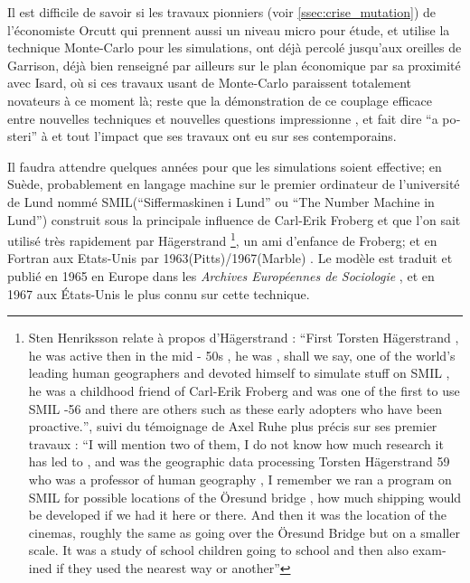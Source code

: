 Il est difficile de savoir si les travaux pionniers (voir \ref{ssec:crise_mutation}) de l'économiste Orcutt \autocite{Orcutt1957, Orcutt1960} qui prennent aussi un niveau micro pour étude, et utilise la technique Monte-Carlo pour les simulations, ont déjà percolé jusqu'aux oreilles de Garrison, déjà bien renseigné par ailleurs sur le plan économique par sa proximité avec Isard, où si ces travaux usant de Monte-Carlo paraissent totalement novateurs à ce moment là; reste que la démonstration de ce couplage efficace entre nouvelles techniques et nouvelles questions impressionne \autocite[120]{Unwin1992}, et fait dire \foreignquote{latin}{a posteri} à \textcite{Morril2005} et \textcite{Gould1970} tout l'impact que ses travaux ont eu sur ses contemporains.

Il faudra attendre quelques années pour que les simulations soient effective; en Suède, probablement en langage machine sur le premier ordinateur de l'université de Lund nommé SMIL(\foreignquote{sweden}{Siffermaskinen i Lund} ou \foreignquote{english}{The Number Machine in Lund}) construit sous la principale influence de Carl-Erik Froberg et que l'on sait utilisé très rapidement par Hägerstrand \footnote{\autocite[32-33]{Lindgren2008} Sten Henriksson relate à propos d'Hägerstrand : \foreignquote{english}{First Torsten Hägerstrand , he was active then in the mid - 50s , he was , shall we say, one of the world's leading human geographers and devoted himself to simulate stuff on SMIL , he was a childhood friend of Carl-Erik Froberg and was one of the first to use SMIL -56 and there are others such as these early adopters who have been proactive.}, suivi du témoignage de Axel Ruhe plus précis sur ses premier travaux : \foreignquote{english}{I will mention two of them, I do not know how much research it has led to , and was the geographic data processing Torsten Hägerstrand 59 who was a professor of human geography , I remember we ran a program on SMIL for possible locations of the Öresund bridge , how much shipping would be developed if we had it here or there. And then it was the location of the cinemas, roughly the same as going over the Öresund Bridge but on a smaller scale. It was a study of school children going to school and then also examined if they used the nearest way or another}}, un ami d'enfance de Froberg; et en Fortran aux Etats-Unis par 1963(Pitts)/1967(Marble) \autocite{Morril2005, Marble1972, Pitts1963}. Le modèle est traduit et publié en 1965 en Europe dans les \textit{Archives Européennes de Sociologie} \autocite{Hagerstrand1965}, et en 1967 \autocite{Hagerstrand1967a} aux États-Unis le plus connu sur cette technique. 

